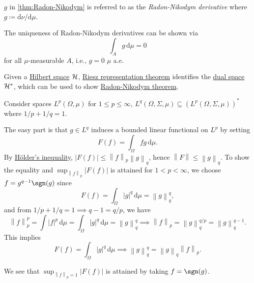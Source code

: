 \begin{notation}
	\(g\) in \autoref{thm:Radon-Nikodym} is referred to as the \emph{Radon-Nikodym derivative} where \(g \coloneqq \mathrm{d}\nu /\mathrm{d}\mu \).
	\begin{note}[Uniqueness]
		The uniqueness of Radon-Nikodym derivatives can be shown via
		\[
			\int _A g\,\mathrm{d} \mu = 0
		\]
		for all \(\mu \)-measurable \(A\), i.e., \(g=0\) \(\mu\) a.e.
	\end{note}
\end{notation}

Given a \hyperref[def:Hilbert-space]{Hilbert space} \(\mathcal{\MakeUppercase{h}} \), \hyperref[thm:Riesz-representation]{Riesz representation theorem} identifies the \hyperref[def:dual-space]{dual space} \(\mathcal{\MakeUppercase{h}} ^{\ast} \), which can be used to show \hyperref[thm:Radon-Nikodym]{Radon-Nikodym theorem}.

\begin{remark}
	Consider spaces \(L^p(\Omega , \mu )\) for \(1 \leq p \leq \infty \), \(L^{q}(\Omega , \Sigma , \mu )\subseteq (L^p(\Omega , \Sigma , \mu ))^{\ast}\) where \(1 / p + 1 / q = 1\).
\end{remark}
\begin{explanation}
	The easy part is that \(g\in L^q\) induces a bounded linear functional on \(L^p\) by setting
	\[
		F(f) = \int _\Omega fg\,\mathrm{d} \mu.
	\]
	By \hyperref[lma:Holder-ineq]{Hölder's inequality}, \(\left\vert F(f) \right\vert \leq \left\lVert f\right\rVert _p \left\lVert g\right\rVert _q\), hence \(\left\lVert F\right\rVert \leq \left\lVert g\right\rVert _q\). To show the equality and \(\sup _{\left\lVert f\right\rVert _p}\left\vert F(f) \right\vert \) is attained for \(1 < p < \infty \), we choose \(f = g^{q - 1}\sgn(g)\) since
	\[
		F(f) = \int _\Omega \left\vert g \right\vert ^q\,\mathrm{d} \mu = \left\lVert g\right\rVert ^q_q,
	\]
	and from \(1 / p + 1 / q = 1 \implies q-1 = q / p\), we have
	\[
		\left\lVert f\right\rVert ^p_p = \int \left\vert f \right\vert ^p \,\mathrm{d} \mu= \int _\Omega \left\vert g \right\vert ^q\,\mathrm{d} \mu = \left\lVert g\right\rVert _q^q \implies \left\lVert f\right\rVert _p = \left\lVert g\right\rVert _q^{q / p} = \left\lVert g\right\rVert _q^{q - 1}.
	\]
	This implies
	\[
		F(f) = \int _\Omega \left\vert g \right\vert ^q\,\mathrm{d} \mu \implies \left\lVert g\right\rVert ^q_q = \left\lVert g\right\rVert _q \left\lVert f\right\rVert _p.
	\]
	\begin{note}
		We see that \(\sup _{\left\lVert f\right\rVert _p = 1} \left\vert F(f) \right\vert \) is attained by taking \(f = \sgn(g)\).
	\end{note}
\end{explanation}